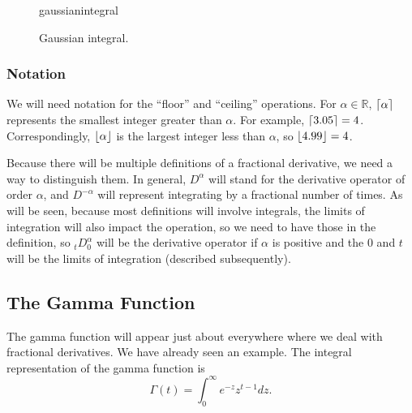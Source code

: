 \begin{figure}
  \centering
  {gaussianintegral}
  \caption{Gaussian integral.}
\label{fig:gaussianintegral}
\end{figure}


\subsubsection{Notation}
We will need notation for the ``floor'' and ``ceiling'' operations. For $\alpha \in \mathbb R$, $\left\lceil \alpha \right\rceil$ represents the smallest integer greater than $\alpha$. For example, $\left\lceil 3.05 \right\rceil = 4$. Correspondingly, $\left\lfloor \alpha \right\rfloor$ is the largest integer less than $\alpha$, so $\left\lfloor 4.99 \right\rfloor = 4$. 

Because there will be multiple definitions of a fractional derivative, we need a way to distinguish them. In general, $D^\alpha$ will stand for the derivative operator of order $\alpha$, and $D^{-\alpha}$ will represent integrating by a fractional number of times. As will be seen, because most definitions will involve integrals, the limits of integration will also impact the operation, so we need to have those in the definition, so $_tD^\alpha_0$ will be the derivative operator if $\alpha$ is positive and the $0$ and $t$ will be the limits of integration (described subsequently). 

\subsection{The Gamma Function}
The gamma function will appear just about everywhere where we deal with fractional derivatives. We have already seen an example. The integral representation of the gamma function is
\begin{equation}
  \boxed{ \Gamma(t) = \int_0^\infty e^{-z} z^{t-1} dz. }
  \label{eq:gammadef}
\end{equation}

